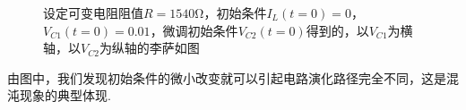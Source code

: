 \documentclass{assignment}
\begin{document}
\begin{figure}[h]
{    }
    \caption{设定可变电阻阻值$R=1540\mathrm{\Omega}$，初始条件$I_L(t=0)=0$，$V_{C1}(t=0)=0.01$，微调初始条件$V_{C2}(t=0)$得到的，以$V_{C1}$为横轴，以$V_{C2}$为纵轴的李萨如图}
    \label{vary-VC2}
\end{figure}

由图中，我们发现初始条件的微小改变就可以引起电路演化路径完全不同，这是混沌现象的典型体现.
\end{document}
